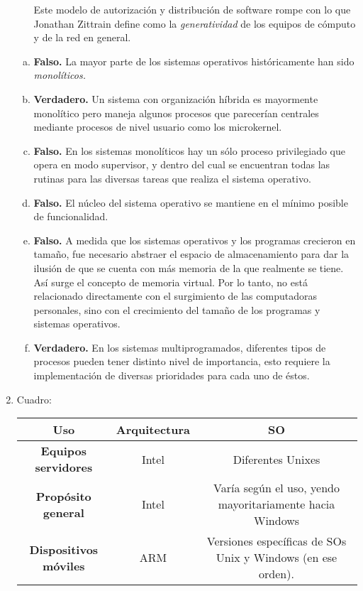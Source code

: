 \documentclass[11pt]{article}
\begin{document}
\begin{enumerate}[1)]
\begin{itemize}
      Este modelo de autorización y distribución de software rompe con lo que Jonathan Zittrain
      define como la \emph{generatividad} de los equipos de cómputo y de la red en general.
    \end{itemize}
    \begin{enumerate}[(a)]
      \item \textbf{Falso.} La mayor parte de los sistemas operativos históricamente
            han sido \emph{monolíticos.}
      \item \textbf{Verdadero.} Un sistema con organización híbrida es mayormente
            monolítico pero maneja algunos procesos que parecerían centrales mediante
            procesos de nivel usuario como los microkernel.
      \item \textbf{Falso.} En los sistemas monolíticos hay un sólo proceso
            privilegiado que opera en modo supervisor, y dentro del cual se encuentran
            todas las rutinas para las diversas tareas que realiza el sistema operativo.
      \item \textbf{Falso.} El núcleo del sistema operativo se mantiene en el mínimo
            posible de funcionalidad.
      \item \textbf{Falso.} A medida que los sistemas operativos y los programas
            crecieron en tamaño, fue necesario abstraer el espacio de almacenamiento
            para dar la ilusión de que se cuenta con más memoria de la que realmente
            se tiene. Así surge el concepto de memoria virtual. Por lo tanto, no está
            relacionado directamente con el surgimiento de las computadoras personales,
            sino con el crecimiento del tamaño de los programas y sistemas operativos. 
      \item \textbf{Verdadero.} En los sistemas multiprogramados, diferentes tipos
            de procesos pueden tener distinto nivel de importancia, esto requiere
            la implementación de diversas prioridades para cada uno de éstos.
    \end{enumerate}
  \item Cuadro: \\
      \begin{tabular}{| c | c | c |}
      \hline
      \textbf{Uso} & \textbf{Arquitectura} & \textbf{SO} \\ \hline
      \textbf{Equipos servidores} & Intel & Diferentes Unixes \\ \hline
      \textbf{Propósito general} & Intel & Varía según el uso, yendo mayoritariamente hacia Windows \\ \hline
      \textbf{Dispositivos móviles} & ARM & Versiones específicas de SOs Unix y Windows (en ese orden). \\ \hline
      \end{tabular}
    

\end{enumerate}
\end{document}
